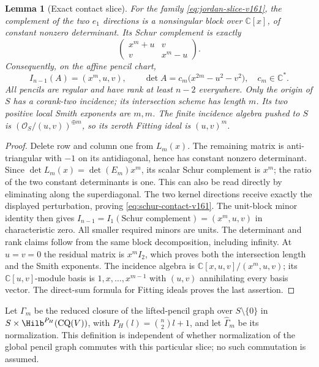 \documentclass[11pt,reqno]{amsart}
\numberwithin{equation}{section}
\newtheorem{lemma}[theorem]{Lemma}
\theoremstyle{definition}\newtheorem{definition}[theorem]{Definition}
\theoremstyle{remark}\newtheorem{remark}[theorem]{Remark}
\newcommand{\C}{\mathbb C}\newcommand{\Q}{\mathbb Q}
\newcommand{\OO}{\mathcal O}\newcommand{\II}{\mathcal I}
\begin{document}
\begin{lemma}[Exact contact slice]
\label{lem:jordan-slice-v161}
For the family \eqref{eq:jordan-slice-v161}, the complement of the two
$e_1$ directions is a nonsingular block over $\C[x]$, of constant
nonzero determinant. Its Schur complement is exactly
\begin{equation}\label{eq:schur-contact-v161}
 \begin{pmatrix}x^m+u&v\\v&x^m-u\end{pmatrix}.
\end{equation}
Consequently, on the affine pencil chart,
\[
 I_{n-1}(A)=(x^m,u,v),\qquad
 \det A=c_m\bigl(x^{2m}-u^2-v^2\bigr),\quad c_m\in\C^*.
\]
All pencils are regular and have rank at least $n-2$ everywhere. Only
the origin of $S$ has a corank-two incidence; its intersection scheme
has length $m$. Its two positive local Smith exponents are $m,m$.
The finite incidence algebra pushed to $S$ is
$(\OO_S/(u,v))^{\oplus m}$, so its zeroth Fitting ideal is $(u,v)^m$.
\end{lemma}
\begin{proof}
Delete row and column one from $L_m(x)$. The remaining matrix is
anti-triangular with $-1$ on its antidiagonal, hence has constant
nonzero determinant. Since
$\det L_m(x)=\det(E_m)x^m$, its scalar Schur complement is $x^m$;
the ratio of the two constant determinants is one. This can also be
read directly by eliminating along the superdiagonal. The two kernel
directions receive exactly the displayed perturbation, proving
\eqref{eq:schur-contact-v161}. The unit-block minor identity then gives
$I_{n-1}=I_1(\text{Schur complement})=(x^m,u,v)$ in characteristic
zero. All smaller required minors are units. The determinant and rank
claims follow from the same block decomposition, including infinity.
At $u=v=0$ the residual matrix is $x^m I_2$, which proves both the
intersection length and the Smith exponents. The incidence algebra is
$\C[x,u,v]/(x^m,u,v)$; its $\C[u,v]$-module basis is
$1,x,\ldots,x^{m-1}$ with $(u,v)$ annihilating every basis vector.
The direct-sum formula for Fitting ideals proves the last assertion.
\end{proof}

Let $\Gamma_m$ be the reduced closure of the lifted-pencil graph over
$S\setminus\{0\}$ in $S\times\Hilb^{P_H}(\mathrm{CQ}(V))$, with
$P_H(l)=\binom n2l+1$, and let $\widehat\Gamma_m$ be its normalization.
This definition is independent of whether normalization of the global
pencil graph commutes with this particular slice; no such commutation
is assumed.
\end{document}
